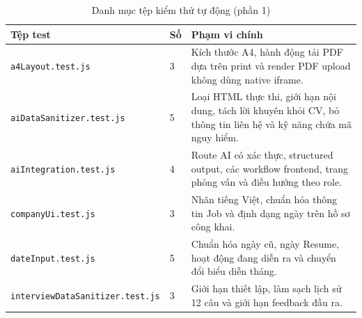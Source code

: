 \begin{table}[H]
    \centering
    \footnotesize
    \begin{tabularx}{\textwidth}{|p{}|p{}|Y|} \hline
        \textbf{Tệp test} & \textbf{Số} & \textbf{Phạm vi chính} \\ \hline
        \texttt{a4Layout.test.js} & 3 & Kích thước A4, hành động tải PDF dựa trên print và render PDF upload không dùng native iframe. \\ \hline
        \texttt{aiDataSanitizer.test.js} & 5 & Loại HTML thực thi, giới hạn nội dung, tách lời khuyên khỏi CV, bỏ thông tin liên hệ và kỹ năng chứa mã nguy hiểm. \\ \hline
        \texttt{aiIntegration.test.js} & 4 & Route AI có xác thực, structured output, các workflow frontend, trang phỏng vấn và điều hướng theo role. \\ \hline
        \texttt{companyUi.test.js} & 3 & Nhãn tiếng Việt, chuẩn hóa thông tin Job và định dạng ngày trên hồ sơ công khai. \\ \hline
        \texttt{dateInput.test.js} & 5 & Chuẩn hóa ngày cũ, ngày Resume, hoạt động đang diễn ra và chuyển đổi biểu diễn tháng. \\ \hline
        \texttt{interviewData}\allowbreak\texttt{Sanitizer.test.js} & 3 & Giới hạn thiết lập, làm sạch lịch sử 12 câu và giới hạn feedback đầu ra. \\ \hline
    \end{tabularx}
    \caption{Danh mục tệp kiểm thử tự động (phần 1)}
    \label{tab:test-inventory-part1}
\end{table}

